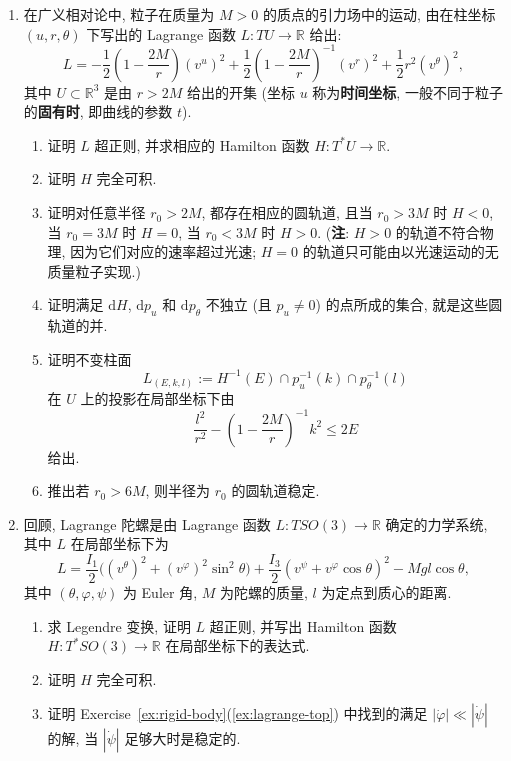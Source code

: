 \begin{RiemannExercise}
\begin{enumerate}[label=(\arabic*),ref=\arabic*,leftmargin=*]
\begin{enumerate}[label=(\alph*),leftmargin=*]
\[\]
在 $\mathbb{R}^2$ 上的投影在局部坐标下由
\[
  u(r)+\frac{l^2}{2mr^2}\leq E
\]
给出.
\item 推出若 $u'(r_0)\geq0$ 且
\[
  u''(r_0)+\frac{3u'(r_0)}{r_0}>0,
\]
则半径为 $r_0$ 的圆轨道稳定.
\end{enumerate}
\item\label{ex:relativistic-circular-orbits}
在广义相对论中, 粒子在质量为 $M>0$ 的质点的引力场中的运动, 由在柱坐标 $(u,r,\theta)$ 下写出的 Lagrange 函数 $L:TU\to\mathbb{R}$ 给出:
\[
  L=-\frac12\left(1-\frac{2M}{r}\right)(v^u)^2
    +\frac12\left(1-\frac{2M}{r}\right)^{-1}(v^r)^2
    +\frac12 r^2(v^\theta)^2,
\]
其中 $U\subset\mathbb{R}^3$ 是由 $r>2M$ 给出的开集 (坐标 $u$ 称为\textbf{时间坐标}, 一般不同于粒子的\textbf{固有时}, 即曲线的参数 $t$).
\begin{enumerate}[label=(\alph*),leftmargin=*]
\item 证明 $L$ 超正则, 并求相应的 Hamilton 函数 $H:T^*U\to\mathbb{R}$.
\item 证明 $H$ 完全可积.
\item 证明对任意半径 $r_0>2M$, 都存在相应的圆轨道, 且当 $r_0>3M$ 时 $H<0$, 当 $r_0=3M$ 时 $H=0$, 当 $r_0<3M$ 时 $H>0$. (\textbf{注}: $H>0$ 的轨道不符合物理, 因为它们对应的速率超过光速; $H=0$ 的轨道只可能由以光速运动的无质量粒子实现.)
\item 证明满足 $\mathrm{d}H$, $\mathrm{d}p_u$ 和 $\mathrm{d}p_\theta$ 不独立 (且 $p_u\ne0$) 的点所成的集合, 就是这些圆轨道的并.
\item 证明不变柱面
\[
  L_{(E,k,l)}:=H^{-1}(E)\cap p_u^{-1}(k)\cap p_\theta^{-1}(l)
\]
在 $U$ 上的投影在局部坐标下由
\[
  \frac{l^2}{r^2}-\left(1-\frac{2M}{r}\right)^{-1}k^2\leq2E
\]
给出.
\item 推出若 $r_0>6M$, 则半径为 $r_0$ 的圆轨道稳定.
\end{enumerate}
\item\label{ex:complete-integrability-of-lagrange-top}
回顾, Lagrange 陀螺是由 Lagrange 函数 $L:TSO(3)\to\mathbb{R}$ 确定的力学系统, 其中 $L$ 在局部坐标下为
\[
  L=\frac{I_1}{2}\bigl((v^\theta)^2+(v^\varphi)^2\sin^2\theta\bigr)
     +\frac{I_3}{2}(v^\psi+v^\varphi\cos\theta)^2-Mgl\cos\theta,
\]
其中 $(\theta,\varphi,\psi)$ 为 Euler 角, $M$ 为陀螺的质量, $l$ 为定点到质心的距离.
\begin{enumerate}[label=(\alph*),leftmargin=*]
\item 求 Legendre 变换, 证明 $L$ 超正则, 并写出 Hamilton 函数 $H:T^*SO(3)\to\mathbb{R}$ 在局部坐标下的表达式.
\item 证明 $H$ 完全可积.
\item 证明 Exercise~\ref{ex:rigid-body}(\ref{ex:lagrange-top}) 中找到的满足 $|\dot\varphi|\ll|\dot\psi|$ 的解, 当 $|\dot\psi|$ 足够大时是稳定的.

\end{enumerate}
\end{enumerate}
\end{RiemannExercise}
